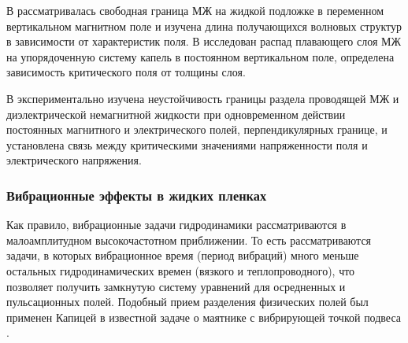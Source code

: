 \documentclass[12pt,a4paper]{article}
\begin{document}
 В \cite{Khokhryakova2021} рассматривалась свободная граница МЖ на жидкой подложке в переменном вертикальном магнитном поле и изучена длина получающихся волновых структур в зависимости от характеристик поля. В \cite{Khokhryakova2024} исследован распад плавающего слоя МЖ на упорядоченную систему капель в постоянном вертикальном поле, определена зависимость критического поля от толщины слоя.

В \cite{ZakinyanAhmed2024} экспериментально изучена неустойчивость границы раздела проводящей МЖ и диэлектрической немагнитной жидкости при одновременном действии постоянных магнитного и электрического полей, перпендикулярных границе, и установлена связь между критическими значениями напряженности поля и электрического напряжения. 


\subsubsection{Вибрационные эффекты в жидких пленках}




Как правило, вибрационные задачи гидродинамики рассматриваются в малоамплитудном высокочастотном приближении. То есть рассматриваются задачи, в которых вибрационное время (период вибраций) много меньше остальных гидродинамических времен (вязкого и теплопроводного), что позволяет получить замкнутую систему уравнений для осредненных и пульсационных полей. Подобный прием разделения физических полей был применен Капицей в известной задаче о маятнике с вибрирующей точкой подвеса \cite{Kapitsa1951a, Kapitsa1951b}.
\end{document}

